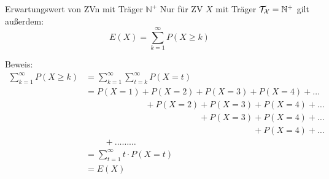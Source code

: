 \documentclass[
  10pt,
  ignorenonframetext,
]{beamer}
\begin{document}
\begin{frame}{Erwartungswert von ZVn mit Träger \(\mathbb{N}^+\)}
\protect\hypertarget{erwartungswert-von-zvn-mit-truxe4ger-mathbbn}{}
Nur für ZV \(X\) mit Träger \(\cal{T}_X = \mathbb{N}^+\) gilt außerdem:
\[E(X) = \sum_{k=1}^\infty P(X \geq k)\]

Beweis: \begin{align*}
\sum_{k=1}^\infty P(X \geq k) &= \sum_{k=1}^\infty \sum_{t = k}^\infty P(X = t)\\
                              &= P(X = 1) + P(X = 2) + P (X = 3) + P(X = 4) + \ldots \\
                              &\phantom{=}\phantom{P(X = 1)\;\;}+ P(X = 2) + P(X = 3) + P(X = 4) + \ldots \\
                              &\phantom{=}\phantom{P(X = 1) + P(X = 2)\;\;}+ P(X = 3) + P(X = 4) + \ldots \\
                              &\phantom{=}\phantom{P(X = 1) + P(X = 2) + P(X = 3)\;\;} + P(X = 4) + \ldots\\
                              &\phantom{=}\;\;\; + \ldots \ldots \ldots \\
                              & = \sum_{t=1}^\infty t \cdot P(X = t) \\
                              & = E(X)
\end{align*}

\end{frame}
\end{document}
